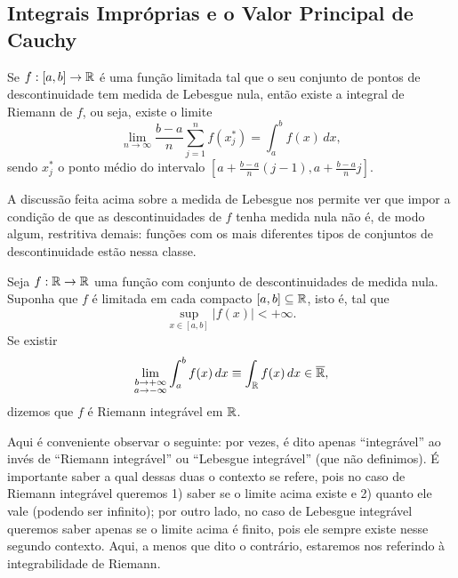     \subsection{Integrais Impróprias e o Valor Principal de Cauchy} %
        Se $f:[a,b]\to\mathbb{R}$ é uma função limitada tal que o seu conjunto de pontos de descontinuidade
        tem medida de Lebesgue nula, então existe a integral de Riemann de $f$, ou seja, existe
        o limite
        \begin{equation*}
            \lim_{n\to\infty} \frac{b-a}{n}\sum_{j=1}^n f(x_j^*) = \int_a^b f(x) \, dx,
        \end{equation*}
        sendo $x_j^*$ o ponto médio do intervalo 
        $\displaystyle{ \left[ a + \frac{b-a}{n}(j-1), a + \frac{b-a}{n}j \right] }$.
        
        A discussão feita acima sobre a medida de Lebesgue nos permite ver que impor a condição
        de que as descontinuidades de $f$ tenha medida nula não é, de modo algum, restritiva demais:
        funções com os mais diferentes tipos de conjuntos de descontinuidade estão nessa classe.
        \begin{definicao}
        \label{def-riemann-integravel}
            Seja $f:\mathbb{R}\to\mathbb{R}$ uma função com conjunto de descontinuidades de medida nula. Suponha
            que $f$ é limitada em cada compacto $[a,b]\subseteq\mathbb{R}$, isto é, tal que
            \begin{equation*}
                \sup_{x\in [a,b]} |f(x)| < +\infty.
            \end{equation*}
            Se existir
            \begin{equation*}
                \lim_{\substack{b\to +\infty \\ a\to -\infty}} \int_a^b f(x) \, dx 
                \equiv \int_{\mathbb{R}} f(x) \, dx \in\overline{\mathbb{R}},
            \end{equation*}
            dizemos que $f$ é Riemann integrável em $\mathbb{R}$.
        \end{definicao}
        Aqui é conveniente observar o seguinte: por vezes, é dito apenas ``integrável'' ao invés
        de ``Riemann integrável'' ou ``Lebesgue integrável'' (que não definimos). É importante
        saber a qual dessas duas o contexto se refere, pois no caso de Riemann integrável queremos
        1) saber se o limite acima existe e 2) quanto ele vale (podendo ser infinito); por outro
        lado, no caso de Lebesgue integrável queremos saber apenas se o limite acima é finito,
        pois ele sempre existe nesse segundo contexto. Aqui, a menos que dito o contrário,
        estaremos nos referindo à integrabilidade de Riemann.
        

